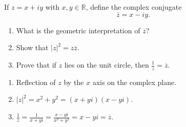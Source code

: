 \documentclass{../note}
\begin{document}
\begin{exercise}{2}
If $z = x + iy$ with $x, y \in \mathbb{R}$, define the complex conjugate
\[
\overline{z} = x - iy.
\]

\begin{enumerate}[label=(\alph*)]
\item What is the geometric interpretation of $\overline{z}$?
\item Show that $|z|^2 = z \overline{z}$.
\item Prove that if $z$ lies on the unit circle, then $\frac{1}{z} = \overline{z}$.
\end{enumerate}
\end{exercise}
\begin{solution}
\begin{enumerate}[label=(\alph*)]
    \item Reflection of $z$ by the $x$ axis on the complex plane.
    \item $|z|^2 = x^2 + y^2 = (x + yi)(x - yi)$.
    \item $\frac1z = \frac{1}{x+yi} = \frac{x-yi}{x^2+y^2} = x-yi = \overline{z}$.
\end{enumerate}
\end{solution}
\end{document}
